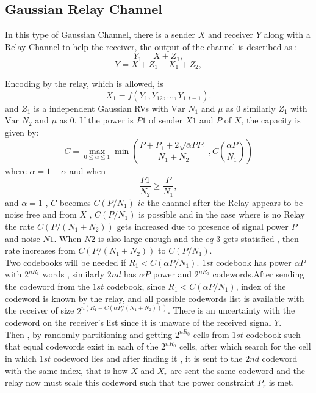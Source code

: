 \subsection{Gaussian Relay Channel}
In this type of Gaussian Channel, there is a sender $X$ and receiver \( Y \) along with a Relay Channel to help the receiver, the output of the channel is described as :
\begin{equation}
Y_1 = X + Z_1,
\end{equation}
\begin{equation}
Y = X + Z_1 + X_1 + Z_2,
\end{equation}

Encoding by the relay, which is allowed, is 
\begin{equation}
X_1 = f(Y_1, Y_{12}, \ldots, Y_{1, t-1}).
\end{equation} 
and \( Z_1 \) is a independent Gaussian RVs with $\mathrm{Var}$ \( N_1 \) and
$\mu$ as $0$ similarly  \( Z_1 \) with $\mathrm{Var}$ \( N_2 \)  and $\mu$ as $0$.
If the power is $P1$ of sender $X1$ and $P$ of $X$, the capacity is given by:
\begin{equation}
C = \max_{0 \leq \alpha \leq 1} \min \left( \frac{P + P_1 + 2\sqrt{\bar{\alpha} P P_1}}{N_1 + N_2}, C(\frac{ \alpha P}{N_1}) \right)
\end{equation}
where \( \bar{\alpha} = 1 - \alpha \) and when 
\begin{equation}
\frac{P1}{N_2} \ge \frac{P}{N_1}, \tag{3}
\end{equation}
and  \( \alpha = 1 \) , $C$ becomes \( C(P/N_1) \) $ie$ the channel after the Relay appears to be noise free and from $X$ , \( C(P/N_1) \) is possible and in the case where is no Relay the rate \( C(P/(N_1 + N_2)) \) gets increased due to presence of signal power $P$ and noise $N1$.
When $N2$ is also large enough and the $eq $ $3$ gets statisfied , then rate increases from \( C(P/(N_1 + N_2)) \) to \( C(P/N_1) \).
\\
Two codebooks will be needed if \( R_1 < C(\alpha P/N_1) \). $1st$ codebook has power \( \alpha P \) with  \( 2^{nR_1} \) words , similarly $2nd$ has \( \bar{\alpha} P \) power and \( 2^{nR_0} \) codewords.After sending the codeword from the $1st$ codebook, since \( R_1 < C(\alpha P/N_1) \), index of the codeword is known by the relay, and all possible codewords list is available with the receiver of size 
\( 2^{n(R_1 - C(\alpha P/(N_1 + N_2)))} \). 
There is an uncertainty with the codeword on the receiver's list since it is unaware of the received signal \( Y \).
\\Then , by randomly partitioning and getting \( 2^{nR_0} \) cells from $1st$ codebook such that equal codewords exist in each of the \( 2^{nR_0} \) cells, after which search for the cell in which $1st$ codeword lies and after finding it , it is sent to the $2nd $ codeword with the same index, that is how \( X \) and \( X_r \) are sent the same codeword and the relay now must scale this codeword such that the power constraint \( P_r \) is met.
